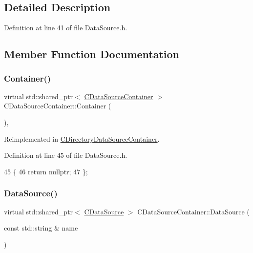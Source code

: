 \subsection{Detailed Description}


Definition at line 41 of file Data\+Source.\+h.



\subsection{Member Function Documentation}
\hypertarget{classCDataSourceContainer_a040c80f46e9d2df36b494290a945e61a}{}\label{classCDataSourceContainer_a040c80f46e9d2df36b494290a945e61a} 
\subsubsection{\texorpdfstring{Container()}{Container()}}
{\footnotesize\ttfamily virtual std\+::shared\+\_\+ptr$<$ \hyperlink{classCDataSourceContainer}{C\+Data\+Source\+Container} $>$ C\+Data\+Source\+Container\+::\+Container (\begin{DoxyParamCaption}{ }\end{DoxyParamCaption})\hspace{0.3cm}{\ttfamily [inline]}, {\ttfamily [virtual]}}



Reimplemented in \hyperlink{classCDirectoryDataSourceContainer_a5a498db9b312c223b0816fc6cc1fcd3d}{C\+Directory\+Data\+Source\+Container}.



Definition at line 45 of file Data\+Source.\+h.


\begin{DoxyCode}
45                                                                  \{
46             \textcolor{keywordflow}{return} \textcolor{keyword}{nullptr};
47         \};
\end{DoxyCode}
\hypertarget{classCDataSourceContainer_aea214236c4ed2aef231072b909982f7d}{}\label{classCDataSourceContainer_aea214236c4ed2aef231072b909982f7d} 
\subsubsection{\texorpdfstring{Data\+Source()}{DataSource()}}
{\footnotesize\ttfamily virtual std\+::shared\+\_\+ptr$<$ \hyperlink{classCDataSource}{C\+Data\+Source} $>$ C\+Data\+Source\+Container\+::\+Data\+Source (\begin{DoxyParamCaption}\item[{const std\+::string \&}]{name }\end{DoxyParamCaption})\hspace{0.3cm}{\ttfamily [pure virtual]}}



